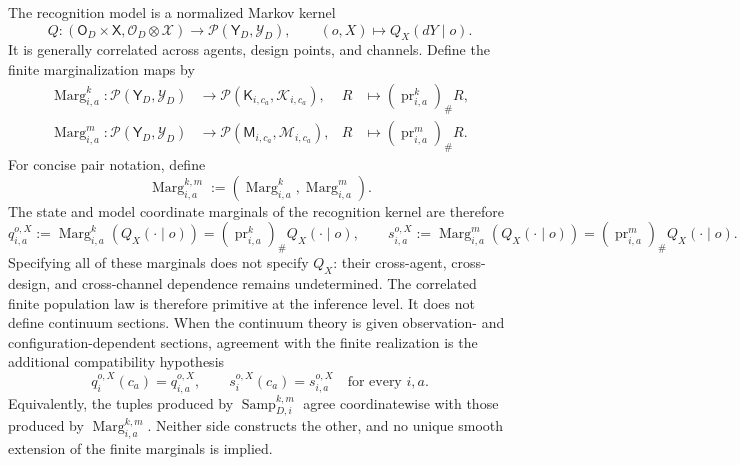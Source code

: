 The recognition model is a normalized Markov kernel
\begin{equation}
Q:(\mathsf O_D\times\mathsf X,
\mathscr O_D\otimes\mathscr X)
\longrightarrow\mathcal P(\mathsf Y_D,\mathscr Y_D),
\qquad
(o,X)\longmapsto Q_X(dY\mid o).
\label{eq:recognition-kernel-type}
\end{equation}
It is generally correlated across agents, design points, and channels. Define the finite marginalization maps by
\begin{align}
\operatorname{Marg}_{i,a}^{k}:
\mathcal P(\mathsf Y_D,\mathscr Y_D)
&\longrightarrow\mathcal P(\mathsf K_{i,c_a},\mathscr K_{i,c_a}),
&R&\longmapsto\left(\operatorname{pr}_{i,a}^{k}\right)_{\#}R,
\label{eq:finite-state-marginalization-map}\\
\operatorname{Marg}_{i,a}^{m}:
\mathcal P(\mathsf Y_D,\mathscr Y_D)
&\longrightarrow\mathcal P(\mathsf M_{i,c_a},\mathscr M_{i,c_a}),
&R&\longmapsto\left(\operatorname{pr}_{i,a}^{m}\right)_{\#}R.
\label{eq:finite-model-marginalization-map}
\end{align}
For concise pair notation, define
\begin{equation}
\operatorname{Marg}_{i,a}^{k,m}
:=\left(\operatorname{Marg}_{i,a}^{k},
\operatorname{Marg}_{i,a}^{m}\right).
\label{eq:collective-finite-marginalization-map}
\end{equation}
The state and model coordinate marginals of the recognition kernel are therefore
\begin{equation}
q_{i,a}^{o,X}
:=\operatorname{Marg}_{i,a}^{k}\left(Q_X(\mathord\cdot\mid o)\right)
=\left(\operatorname{pr}_{i,a}^{k}\right)_{\#}Q_X(\mathord\cdot\mid o),
\qquad
s_{i,a}^{o,X}
:=\operatorname{Marg}_{i,a}^{m}\left(Q_X(\mathord\cdot\mid o)\right)
=\left(\operatorname{pr}_{i,a}^{m}\right)_{\#}Q_X(\mathord\cdot\mid o).
\label{eq:recognition-marginal-sections}
\end{equation}
Specifying all of these marginals does not specify \(Q_X\): their cross-agent, cross-design, and cross-channel dependence remains undetermined. The correlated finite population law is therefore primitive at the inference level. It does not define continuum sections. When the continuum theory is given observation- and configuration-dependent sections, agreement with the finite realization is the additional compatibility hypothesis
\begin{equation}
q_i^{o,X}(c_a)=q_{i,a}^{o,X},
\qquad
s_i^{o,X}(c_a)=s_{i,a}^{o,X}
\quad\text{for every }i,a.
\label{eq:continuum-finite-marginal-compatibility}
\end{equation}
Equivalently, the tuples produced by \(\operatorname{Samp}_{D,i}^{k,m}\) agree coordinatewise with those produced by \(\operatorname{Marg}_{i,a}^{k,m}\). Neither side constructs the other, and no unique smooth extension of the finite marginals is implied.


